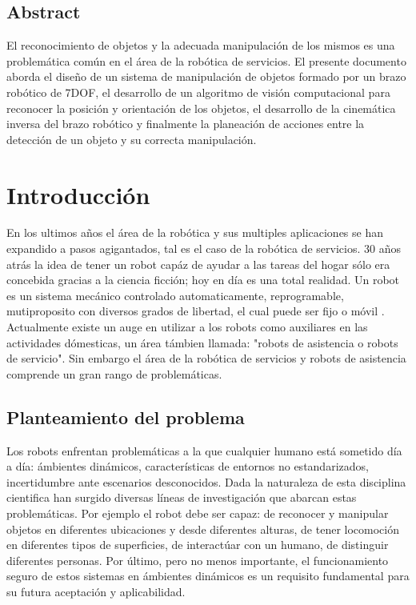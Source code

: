 \section*{Abstract}
	El reconocimiento de objetos y la adecuada manipulación de los mismos es una problemática común en el área de la robótica de servicios. El presente documento aborda el diseño de un sistema de manipulación de objetos formado por un brazo robótico de 7DOF, el desarrollo de un algoritmo de visión computacional para reconocer la posición y orientación de los objetos, el desarrollo de la cinemática inversa del brazo robótico y finalmente la planeación de acciones entre la detección de un objeto y su correcta manipulación.




\chapter{Introducción}
	En los ultimos años el área de la robótica y sus multiples aplicaciones se han expandido a pasos agigantados, tal es el caso de la robótica de servicios. 30 años atrás la idea de tener un robot capáz de ayudar a las tareas del hogar sólo era concebida gracias a la ciencia ficción; hoy en día es una total realidad. Un robot es un sistema mecánico controlado automaticamente, reprogramable, mutiproposito con diversos grados de libertad, el cual puede ser fijo o móvil \cite{khalil2004}. Actualmente existe un auge en utilizar a los robots como auxiliares en las actividades dómesticas, un área támbien llamada: "robots de asistencia o robots de servicio". Sin embargo el área de la robótica de servicios y robots de asistencia comprende un gran rango de problemáticas.\\

	\section{Planteamiento del problema}
		Los robots enfrentan problemáticas a la que cualquier humano está sometido día a día: ámbientes dinámicos, características de entornos no estandarizados, incertidumbre ante escenarios desconocidos. Dada la naturaleza de esta disciplina cientifica han surgido diversas líneas de investigación que abarcan estas problemáticas. Por ejemplo el robot debe ser capaz: de reconocer y manipular objetos en diferentes ubicaciones y desde diferentes alturas, de tener locomoción en diferentes tipos de superficies, de interactúar con un humano, de distinguir diferentes personas. Por último, pero no menos importante, el funcionamiento seguro de estos sistemas en ámbientes dinámicos es un requisito fundamental para su futura aceptación y aplicabilidad.\\


